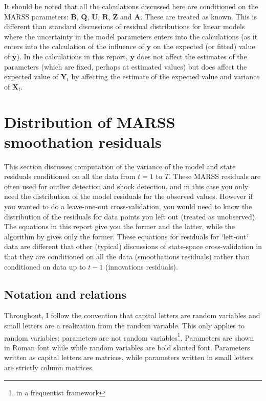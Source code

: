 \documentclass[]{article}
\def\UPS{\mbox{\boldmath $\Upsilon$}}
\def\XI{\mbox{\boldmath $\Xi$}}
\def\AA{\mbox{$\mathbf A$}}	\def\aa{\mbox{$\mathbf a$}}
\def\BB{\mbox{$\mathbf B$}}	\def\bb{\mbox{$\mathbf b$}} \def\Bb{\mbox{$\mathbf J$}} \def\Ba{\mbox{$\mathbf L$}} \def\Bm{\UPS}
\def\QQ{\mbox{$\mathbf Q$}}	 \def\qq{\mbox{$\mathbf q$}} \def\Qb{\mbox{$\mathbf G$}}  \def\Qm{\mathbb{Q}}
\def\RR{\mbox{$\mathbf R$}}	 \def\rr{\mbox{$\mathbf r$}} \def\Rb{\mbox{$\mathbf H$}}	\def\Rm{\mathbb{R}}
\def\UU{\mbox{$\mathbf U$}}	\def\uu{\mbox{$\mathbf u$}}
\def\XX{\mbox{$\pmb{X}$}}	\def\xx{\mbox{$\pmb{x}$}}
\def\YY{\mbox{$\pmb{Y}$}}	\def\yy{\mbox{$\pmb{y}$}}
\def\ZZ{\mbox{$\mathbf Z$}}	\def\zz{\mbox{$\mathbf z$}}	\def\Zb{\mbox{$\mathbf M$}} \def\Za{\mbox{$\mathbf N$}} \def\Zm{\XI}
\begin{document}
It should be noted that all the calculations discussed here are conditioned on the MARSS parameters: $\BB$, $\QQ$, $\UU$, $\RR$, $\ZZ$ and $\AA$. These are treated as known. This is different than standard discussions of residual distributions for linear models where the uncertainty in the model parameters enters into the calculations (as it enters into the calculation of the influence of $\yy$ on the expected (or fitted) value of $\yy$). In the calculations in this report, $\yy$ does not affect the estimates of the parameters (which are fixed, perhaps at estimated values) but does affect the expected value of $\YY_t$ by affecting the estimate of the expected value and variance of $\XX_t$. 

\section{Distribution of MARSS smoothation residuals}\label{sec:smoothations}

This section discusses computation of the variance of the model and state residuals conditioned on all the data from $t=1$ to $T$.  These MARSS residuals are often used for outlier detection and shock detection, and in this case you only need the distribution of the model residuals for the observed values.  However if you wanted to do a leave-one-out cross-validation, you would need to know the distribution of the residuals for data points you left out (treated as unobserved).  The equations in this report give you the former and the latter, while the algorithm by \citet{Harveyetal1998} gives only the former. These equations for residuals for `left-out` data are different that other (typical) discussions of state-space cross-validation \citep{deJong1988} in that they are conditioned on all the data (smoothations residuals) rather than conditioned on data up to $t-1$ (innovations residuals).

\subsection{Notation and relations}

Throughout, I follow the convention that capital letters are random variables and small letters are a realization from the random variable.  This only applies to random variables; parameters are not random variables\footnote{in a frequentist framework}. Parameters are shown in Roman font while while random variables are bold slanted font. Parameters written as capital letters are matrices, while parameters written in small letters are strictly column matrices. 
\end{document}
